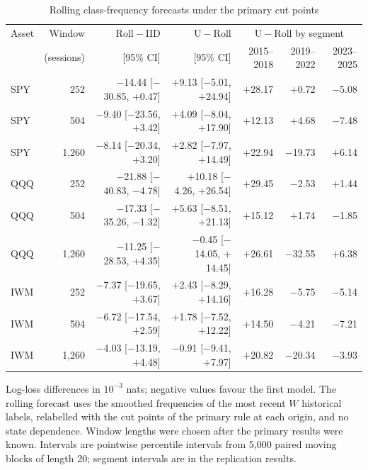 \begin{table}[!htbp]\centering\footnotesize\setlength{\tabcolsep}{4pt}
\caption{Rolling class-frequency forecasts under the primary cut points}\label{tab:rollfreq}
\begin{tabular}{lrrrrrr}\toprule
Asset & Window & $\mathrm{Roll}-\mathrm{IID}$ & $\mathrm{U}-\mathrm{Roll}$ & \multicolumn{3}{c}{$\mathrm{U}-\mathrm{Roll}$ by segment}\\
 & (sessions) & [95\% CI] & [95\% CI] & 2015--2018 & 2019--2022 & 2023--2025\\\midrule
SPY & 252 & $-$14.44 [$-$30.85, $+$0.47] & $+$9.13 [$-$5.01, $+$24.94] & $+$28.17 & $+$0.72 & $-$5.08\\
SPY & 504 & $-$9.40 [$-$23.56, $+$3.42] & $+$4.09 [$-$8.04, $+$17.90] & $+$12.13 & $+$4.68 & $-$7.48\\
SPY & 1,260 & $-$8.14 [$-$20.34, $+$3.20] & $+$2.82 [$-$7.97, $+$14.49] & $+$22.94 & $-$19.73 & $+$6.14\\
\midrule
QQQ & 252 & $-$21.88 [$-$40.83, $-$4.78] & $+$10.18 [$-$4.26, $+$26.54] & $+$29.45 & $-$2.53 & $+$1.44\\
QQQ & 504 & $-$17.33 [$-$35.26, $-$1.32] & $+$5.63 [$-$8.51, $+$21.13] & $+$15.12 & $+$1.74 & $-$1.85\\
QQQ & 1,260 & $-$11.25 [$-$28.53, $+$4.35] & $-$0.45 [$-$14.05, $+$14.45] & $+$26.61 & $-$32.55 & $+$6.38\\
\midrule
IWM & 252 & $-$7.37 [$-$19.65, $+$3.67] & $+$2.43 [$-$8.29, $+$14.16] & $+$16.28 & $-$5.75 & $-$5.14\\
IWM & 504 & $-$6.72 [$-$17.54, $+$2.59] & $+$1.78 [$-$7.52, $+$12.22] & $+$14.50 & $-$4.21 & $-$7.21\\
IWM & 1,260 & $-$4.03 [$-$13.19, $+$4.48] & $-$0.91 [$-$9.41, $+$7.97] & $+$20.82 & $-$20.34 & $-$3.93\\
\bottomrule\end{tabular}
\par\smallskip\parbox{0.98\linewidth}{\footnotesize Log-loss differences in $10^{-3}$ nats; negative values favour the first model. The rolling forecast uses the smoothed frequencies of the most recent $W$ historical labels, relabelled with the cut points of the primary rule at each origin, and no state dependence. Window lengths were chosen after the primary results were known. Intervals are pointwise percentile intervals from 5,000 paired moving blocks of length 20; segment intervals are in the replication results.}
\end{table}
